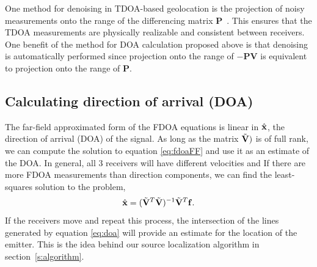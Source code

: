 One method for denoising in TDOA-based geolocation is the projection of noisy measurements onto the range of the differencing matrix $\mathbf{P}$~\cite{Schmidt1996,Compagnoni2017}. This ensures that the TDOA measurements are physically realizable and consistent between receivers. One benefit of the method for DOA calculation proposed above is that denoising is automatically performed since projection onto the range of $\mathbf{-PV}$ is equivalent to projection onto the range of $\mathbf{P}$.

\subsection{Calculating direction of arrival (DOA)}
The far-field approximated form of the FDOA equations is linear in $\hat{\mathbf{x}}$, the direction of arrival (DOA) of the signal. As long as the matrix $\tilde{\mathbf{V}})$ is of full rank, we can compute the solution to equation \ref{eq:fdoaFF} and use it as an estimate of the DOA. In general, all 3 receivers will have different velocities and  If there are more FDOA measurements than direction components, we can find the least-squares solution to the problem,
\begin{align}
  \label{eq:doa}
\hat{\mathbf{x}} = (\tilde{\mathbf{V}}^T\tilde{\mathbf{V}})^{-1}\tilde{\mathbf{V}}^T\mathbf{f}.
\end{align}
If the receivers move and repeat this process, the intersection of the lines generated by equation \ref{eq:doa} will provide an estimate for the location of the emitter. This is the idea behind our source localization algorithm in section~\ref{s:algorithm}.
